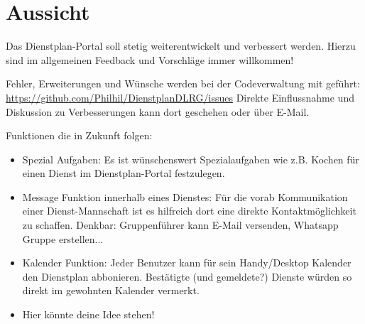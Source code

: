 \chapter{Aussicht}
\label{cha:aussicht}
Das Dienstplan-Portal soll stetig weiterentwickelt und verbessert werden. Hierzu sind im allgemeinen Feedback und Vorschläge immer willkommen!

\vspace*{5mm} \noindent Fehler, Erweiterungen und Wünsche werden bei der Codeverwaltung mit geführt: \url{https://github.com/Philhil/DienstplanDLRG/issues}
Direkte Einflussnahme und Diskussion zu Verbesserungen kann dort geschehen oder über E-Mail.

\vspace*{5mm} \noindent Funktionen die in Zukunft folgen:

\begin{itemize}
\item Spezial Aufgaben: Es ist wünschenswert Spezialaufgaben wie z.B. Kochen für einen Dienst im Dienstplan-Portal festzulegen. 
\item Message Funktion innerhalb eines Dienstes: Für die vorab Kommunikation einer Dienst-Mannschaft ist es hilfreich dort eine direkte Kontaktmöglichkeit zu schaffen. Denkbar: Gruppenführer kann E-Mail versenden, Whatsapp Gruppe erstellen...
\item Kalender Funktion: Jeder Benutzer kann für sein Handy/Desktop Kalender den Dienstplan abbonieren. Bestätigte (und gemeldete?) Dienste würden so direkt im gewohnten Kalender vermerkt.
\item Hier könnte deine Idee stehen!
\end{itemize}